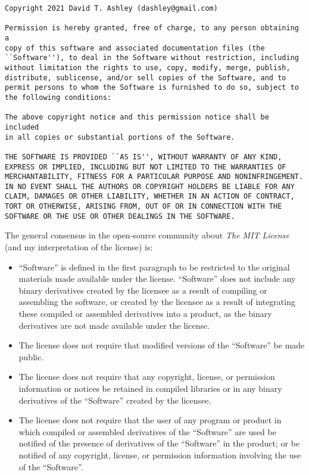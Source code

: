 \begin{small}
\begin{verbatim}
Copyright 2021 David T. Ashley (dashley@gmail.com)

Permission is hereby granted, free of charge, to any person obtaining a 
copy of this software and associated documentation files (the 
``Software''), to deal in the Software without restriction, including 
without limitation the rights to use, copy, modify, merge, publish, 
distribute, sublicense, and/or sell copies of the Software, and to 
permit persons to whom the Software is furnished to do so, subject to 
the following conditions: 

The above copyright notice and this permission notice shall be included 
in all copies or substantial portions of the Software.  

THE SOFTWARE IS PROVIDED ``AS IS'', WITHOUT WARRANTY OF ANY KIND, 
EXPRESS OR IMPLIED, INCLUDING BUT NOT LIMITED TO THE WARRANTIES OF 
MERCHANTABILITY, FITNESS FOR A PARTICULAR PURPOSE AND NONINFRINGEMENT.  
IN NO EVENT SHALL THE AUTHORS OR COPYRIGHT HOLDERS BE LIABLE FOR ANY 
CLAIM, DAMAGES OR OTHER LIABILITY, WHETHER IN AN ACTION OF CONTRACT, 
TORT OR OTHERWISE, ARISING FROM, OUT OF OR IN CONNECTION WITH THE 
SOFTWARE OR THE USE OR OTHER DEALINGS IN THE SOFTWARE.  
\end{verbatim}
\end{small}

The general consensus in the open-source community about 
\emph{The MIT License} (and my interpretation of the 
license) is:

\begin{itemize}
\item ``Software'' is defined in the first paragraph to 
      be restricted to the original materials made 
      available under the license.  ``Software'' does not 
      include any binary derivatives created by the licensee 
      as a result of compiling or assembling the software, 
      or created by the licensee as a result of integrating 
      these compiled or assembled derivatives into a 
      product, as the binary derivatives are not made 
      available under the license.
\item The license does not require that modified versions
      of the ``Software'' be made public.
\item The license does not require that any copyright, 
      license, or permission information or notices be 
      retained in compiled libraries or in any binary 
      derivatives of the ``Software'' created by the 
      licensee.
\item The license does not require that the user of any 
      program or product in which compiled or assembled 
      derivatives of the ``Software'' are used be notified 
      of the presence of derivatives of the ``Software'' in 
      the product; or be notified of any copyright, license, 
      or permission information involving the use of the 
      ``Software''.
\end{itemize}


